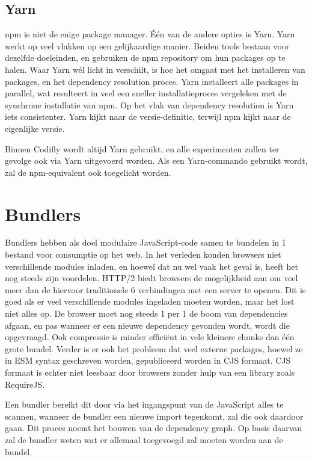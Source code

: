 \subsection{Yarn}

npm is niet de enige package manager. Één van de andere opties is Yarn. Yarn werkt op veel vlakken op een gelijkaardige manier. Beiden tools bestaan voor dezelfde doeleinden, en gebruiken de npm repository om hun packages op te halen. Waar Yarn wél licht in verschilt, is hoe het omgaat met het installeren van packages, en het dependency resolution proces. Yarn installeert alle packages in parallel, wat resulteert in veel een sneller installatieproces vergeleken met de synchrone installatie van npm. Op het vlak van dependency resolution is Yarn iets consistenter. Yarn kijkt naar de versie-definitie, terwijl npm kijkt naar de eigenlijke versie. \autocite{Kay2021} 

Binnen Codifly wordt altijd Yarn gebruikt, en alle experimenten zullen ter gevolge ook via Yarn uitgevoerd worden. Als een Yarn-commando gebruikt wordt, zal de npm-equivalent ook toegelicht worden.

\section{Bundlers}

Bundlers hebben als doel modulaire JavaScript-code samen te bundelen in 1 bestand voor consumptie op het web. In het verleden konden browsers niet verschillende modules inladen, en hoewel dat nu wel vaak het geval is, heeft het nog steeds zijn voordelen. HTTP/2 biedt browsers de mogelijkheid aan om veel meer dan de hiervoor traditionele 6 verbindingen met een server te openen. Dit is goed als er veel verschillende modules ingeladen moeten worden, maar het lost niet alles op. De browser moet nog steeds 1 per 1 de boom van dependencies afgaan, en pas wanneer er een nieuwe dependency gevonden wordt, wordt die opgevraagd. Ook compressie is minder efficiënt in vele kleinere chunks dan één grote bundel. \autocite{you_2021} Verder is er ook het probleem dat veel externe packages, hoewel ze in ESM syntax geschreven worden, gepubliceerd worden in CJS formaat. CJS formaat is echter niet leesbaar door browsers zonder hulp van een library zoals RequireJS. \autocite{sweeney_2020}

Een bundler bereikt dit door via het ingangspunt van de JavaScript alles te scannen, wanneer de bundler een nieuwe import tegenkomt, zal die ook daardoor gaan. Dit proces noemt het bouwen van de dependency graph. Op basis daarvan zal de bundler weten wat er allemaal toegevoegd zal moeten worden aan de bundel.

